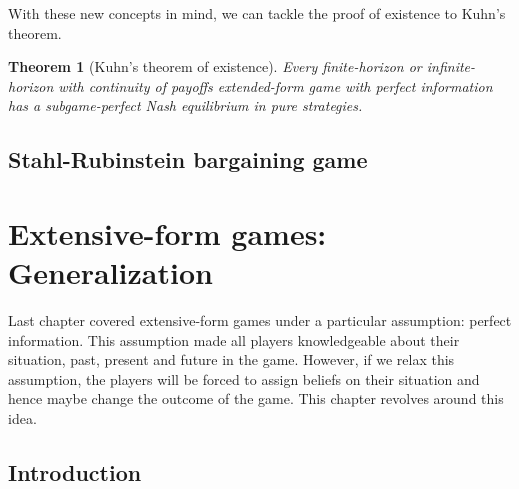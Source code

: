 \documentclass[12pt]{report}
\newtheorem{theorem}{Theorem}[chapter]
\begin{document}
With these new concepts in mind, we can tackle the proof of existence to Kuhn's theorem.

\begin{theorem}[Kuhn's theorem of existence]
Every finite-horizon or infinite-horizon with continuity of payoffs extended-form game with perfect information has a subgame-perfect Nash equilibrium in pure strategies.
\end{theorem}

\section{Stahl-Rubinstein bargaining game}



\chapter{Extensive-form games: Generalization}

Last chapter covered extensive-form games under a particular assumption: perfect information. This assumption made all players knowledgeable about their situation, past, present and future in the game. However, if we relax this assumption, the players will be forced to assign beliefs on their situation and hence maybe change the outcome of the game. This chapter revolves around this idea.

\section{Introduction}
\end{document}
